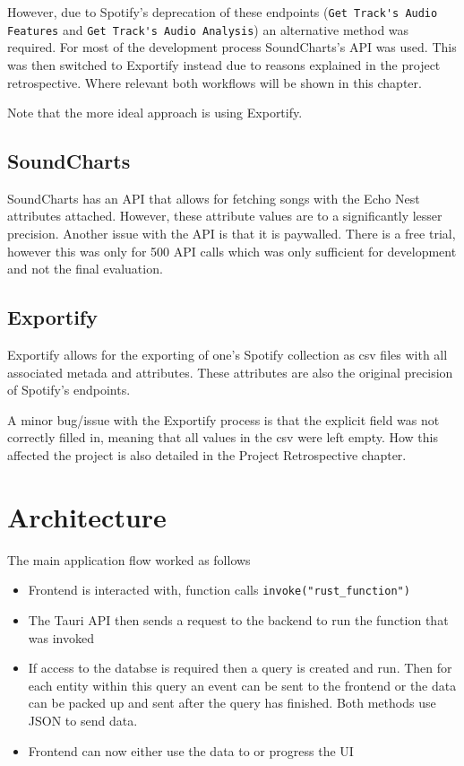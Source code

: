 However, due to Spotify's deprecation of these endpoints (\lstinline|Get Track's Audio Features| and \lstinline|Get Track's Audio Analysis|) an alternative method was required. For most of the development process SoundCharts's API was used. This was then switched to Exportify instead due to reasons explained in the project retrospective. Where relevant both workflows will be shown in this chapter.

Note that the more ideal approach is using Exportify.

\subsection{SoundCharts}
SoundCharts has an API that allows for fetching songs with the Echo Nest attributes attached. However, these attribute values are to a significantly lesser precision. Another issue with the API is that it is paywalled. There is a free trial, however this was only for 500 API calls which was only sufficient for development and not the final evaluation.

\subsection{Exportify}
Exportify allows for the exporting of one's Spotify collection as csv files with all associated metada and attributes. These attributes are also the original precision of Spotify's endpoints.

A minor bug/issue with the Exportify process is that the explicit field was not correctly filled in, meaning that all values in the csv were left empty. How this affected the project is also detailed in the Project Retrospective chapter.

\section{Architecture}
The main application flow worked as follows\begin{itemize}
    \item Frontend is interacted with, function calls \texttt{invoke("rust\_function")}
    \item The Tauri API then sends a request to the backend to run the function that was invoked
    \item If access to the databse is required then a query is created and run. Then for each entity within this query an event can be sent to the frontend or the data can be packed up and sent after the query has finished. Both methods use JSON to send data.
    \item Frontend can now either use the data to or progress the UI
\end{itemize}

